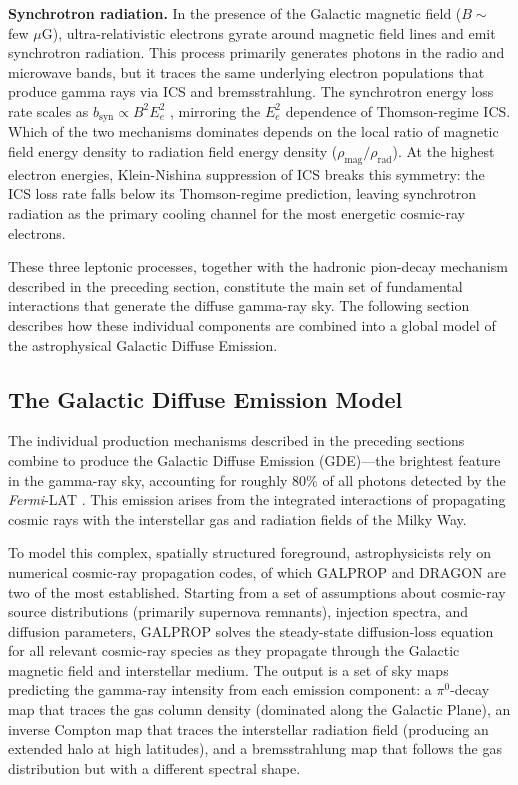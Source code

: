 \textbf{Synchrotron radiation.}
In the presence of the Galactic magnetic field ($B \sim$ few $\mu$G), ultra-relativistic electrons gyrate around magnetic field lines and emit synchrotron radiation.
This process primarily generates photons in the radio and microwave bands, but it traces the same underlying electron populations that produce gamma rays via ICS and bremsstrahlung.
The synchrotron energy loss rate scales as $b_\text{syn} \propto B^2 E_e^2$ \cite{Hooper:2024}, mirroring the $E_e^2$ dependence of Thomson-regime ICS.
Which of the two mechanisms dominates depends on the local ratio of magnetic field energy density to radiation field energy density ($\rho_\text{mag}/\rho_\text{rad}$).
At the highest electron energies, Klein-Nishina suppression of ICS breaks this symmetry: the ICS loss rate falls below its Thomson-regime prediction, leaving synchrotron radiation as the primary cooling channel for the most energetic cosmic-ray electrons.

These three leptonic processes, together with the hadronic pion-decay mechanism described in the preceding section, constitute the main set of fundamental interactions that generate the diffuse gamma-ray sky.
The following section describes how these individual components are combined into a global model of the astrophysical Galactic Diffuse Emission.

\subsection{The Galactic Diffuse Emission Model}
\label{sec:gde_model}

The individual production mechanisms described in the preceding sections combine to produce the Galactic Diffuse Emission (GDE)---the brightest feature in the gamma-ray sky, accounting for roughly 80\% of all photons detected by the \textit{Fermi}-LAT \cite{Fermi-LAT:2014ryh,DGRB-review}.
This emission arises from the integrated interactions of propagating cosmic rays with the interstellar gas and radiation fields of the Milky Way.

To model this complex, spatially structured foreground, astrophysicists rely on numerical cosmic-ray propagation codes, of which GALPROP \cite{Strong:2007nh} and DRAGON \cite{Evoli:2016xgn} are two of the most established.
Starting from a set of assumptions about cosmic-ray source distributions (primarily supernova remnants), injection spectra, and diffusion parameters, GALPROP solves the steady-state diffusion-loss equation for all relevant cosmic-ray species as they propagate through the Galactic magnetic field and interstellar medium.
The output is a set of sky maps predicting the gamma-ray intensity from each emission component: a $\pi^0$-decay map that traces the gas column density (dominated along the Galactic Plane), an inverse Compton map that traces the interstellar radiation field (producing an extended halo at high latitudes), and a bremsstrahlung map that follows the gas distribution but with a different spectral shape.

